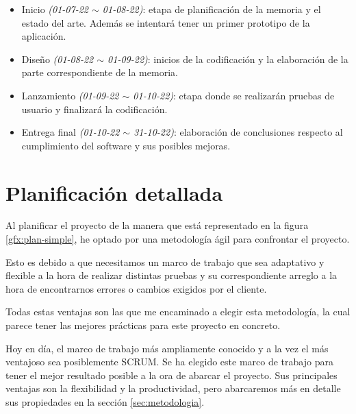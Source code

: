 \newpage

\begin{itemize}
    \item Inicio \textit{(01-07-22 $\sim$ 01-08-22)}: etapa de planificación de la memoria y el estado del arte. Además se intentará tener un primer prototipo de la aplicación.
    \item Diseño \textit{(01-08-22 $\sim$ 01-09-22)}: inicios de la codificación y la elaboración de la parte correspondiente de la memoria.
    \item Lanzamiento \textit{(01-09-22 $\sim$ 01-10-22)}: etapa donde se realizarán pruebas de usuario y finalizará la codificación.
    \item Entrega final \textit{(01-10-22 $\sim$ 31-10-22)}: elaboración de conclusiones respecto al cumplimiento del software y sus posibles mejoras.
\end{itemize}

\section{Planificación detallada}

Al planificar el proyecto de la manera que está representado en la figura \ref{gfx:plan-simple}, he optado por una metodología ágil para confrontar el proyecto.

\vspace{0.3cm}

Esto es debido a que necesitamos un marco de trabajo que sea adaptativo y flexible a la hora de realizar distintas pruebas y su correspondiente arreglo a la hora de encontrarnos errores o cambios exigidos por el cliente.

\vspace{0.3cm}

Todas estas ventajas son las que me encaminado a elegir esta metodología, la cual parece tener las mejores prácticas para este proyecto en concreto.

\vspace{0.3cm}

Hoy en día, el marco de trabajo más ampliamente conocido y a la vez el más ventajoso sea posiblemente SCRUM. Se ha elegido este marco de trabajo para tener el mejor resultado posible a la ora de abarcar el proyecto. Sus principales ventajas son la flexibilidad y la productividad, pero abarcaremos más en detalle sus propiedades en la sección \ref{sec:metodologia}.

\vspace{0.3cm}

